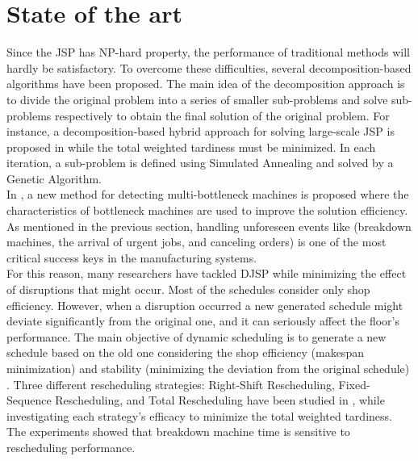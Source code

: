 \documentclass{article}
\begin{document}
\section{State of the art}
Since the JSP has NP-hard property, the performance of traditional methods will hardly be satisfactory. To overcome these difficulties, several decomposition-based algorithms have been proposed. The main idea of the decomposition approach is to divide the original problem into a series of smaller sub-problems and solve sub-problems respectively to obtain the final solution of the original problem. For instance, a decomposition-based hybrid approach for solving large-scale JSP is proposed in \cite{zhang2010hybrid} while the total weighted tardiness must be minimized. In each iteration, a sub-problem is defined using Simulated Annealing and solved by a Genetic Algorithm. \\

In \cite{zhai2014decomposition}, a new method for detecting multi-bottleneck machines is proposed where the characteristics of bottleneck machines are used to improve the solution efficiency. As mentioned in the previous section, handling unforeseen events like (breakdown machines, the arrival of urgent jobs, and canceling orders) is one of the most critical success keys in the manufacturing systems. \\

For this reason, many researchers have tackled DJSP while minimizing the effect of disruptions that might occur. Most of the schedules consider only shop efficiency. However, when a disruption occurred a new generated schedule might deviate significantly from the original one, and it can seriously affect the floor's performance. The main objective of dynamic scheduling is to generate a new schedule based on the old one considering the shop efficiency (makespan minimization) and stability (minimizing the deviation from the original schedule) \cite{ouelhadj2009survey}. Three different rescheduling strategies: Right-Shift Rescheduling, Fixed-Sequence Rescheduling, and Total Rescheduling have been studied in \cite{mason2004rescheduling}, while investigating each strategy's efficacy to minimize the total weighted tardiness. The experiments showed that breakdown machine time is sensitive to rescheduling performance.\\
\end{document}
